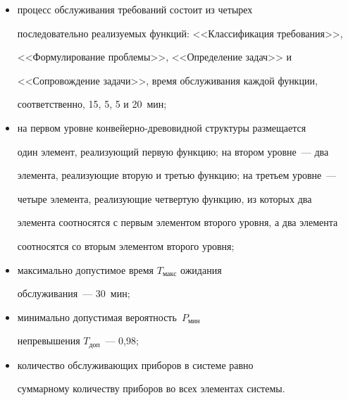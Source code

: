 \begin{itemize}


\item[(а)] процесс обслуживания требований состоит из четырех 


последовательно реализуемых функций: <<Классификация требования>>, 


<<Формулирование проблемы>>, <<Определение задач>> и 


<<Сопровождение задачи>>, время обслуживания каждой функции, 


соответственно, 15, 5, 5 и 20~мин;


\item[(б)] на первом уровне конвейерно-древовидной структуры размещается 


один элемент, реализующий первую функцию; на втором уровне~--- два 


элемента, реализующие вторую и третью функцию; на третьем уровне~--- 


четыре элемента, реализующие четвертую функцию, из которых два 


элемента соотносятся с первым элементом второго уровня, а два элемента 


соотносятся со вторым элементом второго уровня;


\item[(в)] максимально допустимое время $T_{\mathrm{макс}}$ ожидания 


обслуживания~--- 30~мин; 


\item[(г)] минимально допустимая вероятность~$P_{\mathrm{мин}}$ 


непревышения $T_{\mathrm{доп}}$~--- 0,98; 


\item[(д)] количество обслуживающих приборов в системе равно 


суммарному количеству приборов во всех элементах системы.


\end{itemize}





